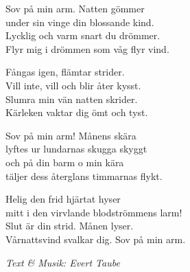 \vspace{10pt}
Sov på min arm. Natten gömmer\\
under sin vinge din blossande kind.\\
Lycklig och varm snart du drömmer.\\
Flyr mig i drömmen som våg flyr vind.\par
\vspace{10pt}
Fångas igen, flämtar strider.\\
Vill inte, vill och blir åter kysst.\\
Slumra min vän natten skrider.\\
Kärleken vaktar dig ömt och tyst.\par
\vspace{10pt}
Sov på min arm! Månens skära\\
lyftes ur lundarnas skugga skyggt\\
och på din barm o min kära\\
täljer dess återglans timmarnas flykt.\par
\vspace{10pt}
Helig den frid hjärtat hyser\\
mitt i den virvlande blodströmmens larm!\\
Slut är din strid. Månen lyser.\\
Vårnattsvind svalkar dig. Sov på min arm.
\par
\vspace{10pt}
{\footnotesize\textit{Text \& Musik: Evert Taube}}
